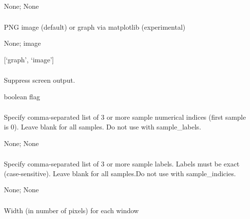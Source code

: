 \documentclass[letterpaper,11pt,english]{sphinxmanual}
\begin{document}
 None;  None


\subsubsection{}
\label{\detokenize{prog_desc:plot-type-plottype}}
 PNG image (default) or graph via matplotlib (experimental)

 None;  image

 {[}‘graph’, ‘image’{]}


\subsubsection{}
\label{\detokenize{prog_desc:id134}}
 Suppress screen output.

 boolean flag


\subsubsection{}
\label{\detokenize{prog_desc:id135}}
 Specify comma-separated list of 3 or more sample numerical indices (first sample is 0). Leave blank for all samples. Do not use with \textendash{}sample\_labels.

 None;  None


\subsubsection{}
\label{\detokenize{prog_desc:id136}}
 Specify comma-separated list of 3 or more sample labels. Labels must be exact (case-sensitive). Leave blank for all samples.Do not use with \textendash{}sample\_indicies.

 None;  None


\subsubsection{}
\label{\detokenize{prog_desc:xscale}}
 Width (in number of pixels) for each window
\end{document}
